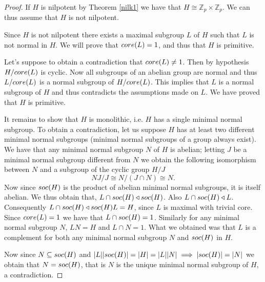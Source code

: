 \begin{proof}
    If $H$ is nilpotent by Theorem \ref{nilk1} we have that $H \cong \mathbb{Z}_p \times \mathbb{Z}_p$. We can thus assume that $H$ is not nilpotent.

    Since $H$ is not nilpotent there exists a maximal subgroup $L$ of $H$ such that $L$ is not normal in $H$. We will prove that $core({L}) = 1$, and thus that $H$ is primitive. 
    
    Let's suppose to obtain a contradiction that $core({L}) \ne 1$. Then by hypothesis $H/core({L})$ is cyclic. Now all subgroups of an abelian group are normal and thus $L/core({L})$ is a normal subgroup of $H/core({L})$. This implies that $L$ is a normal subgroup of $H$ and thus contradicts the assumptions made on $L$. We have proved that $H$ is primitive.

    It remains to show that $H$ is monolithic, i.e. $H$ has a single minimal normal subgroup. To obtain a contradiction, let us suppose $H$ has at least two different minimal normal subgroups (minimal normal subgroups of a group always exist). We have that any minimal normal subgroup $N$ of $H$ is abelian; letting $J$ be a minimal normal subgroup different from $N$ we obtain the following isomorphism between $N$ and a subgroup of the cyclic group $H/J$
    $$
        NJ/J \cong N/(J \cap N) \cong N.
    $$
    Now since $soc {(H)}$ is the product of abelian minimal normal subgroups, it is itself abelian. We thus obtain that, $L \cap soc {(H)} \triangleleft soc {(H)}$. Also $L \cap soc {(H)} \triangleleft L$. Consequently $L \cap soc {(H)} \triangleleft soc {(H)}L = H$, since $L$ is maximal with trivial core.
    Since $core({L}) = 1$ we have that $L \cap soc {(H)} = 1$. Similarly for any minimal normal subgroup $N$, $LN=H$ and $L \cap N = 1$. What we obtained was that $L$ is a complement for both any minimal normal subgroup $N$ and $soc {(H)}$ in $H$.

    Now since $N \subseteq soc {(H)}$ and $| L || soc {(H)} | = | H | = | L || N | \implies | soc {(H)} | = | N |$ we obtain that $N = soc {(H)}$, that is $N$ is the unique minimal normal subgroup of $H$, a contradiction.
\end{proof}